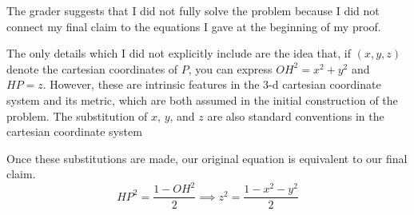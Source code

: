 \documentclass{article}
\begin{document}
The grader suggests that I did not fully solve the problem because I did not connect my final claim to the equations I gave at the beginning of my proof.

The only details which I did not explicitly include are the idea that, if $(x,y,z)$ denote the cartesian coordinates of $P$, you can express $OH^2 = x^2+y^2$ and $HP = z$.
However, these are intrinsic features in the 3-d cartesian coordinate system and its metric, which are both assumed in the initial construction of the problem.
The substitution of $x$, $y$, and $z$ are also standard conventions in the cartesian coordinate system

Once these substitutions are made, our original equation is equivalent to our final claim.
$$HP^2 = \frac{1-OH^2}{2} \implies z^2 = \frac{1-x^2-y^2}{2}$$
\end{document}
